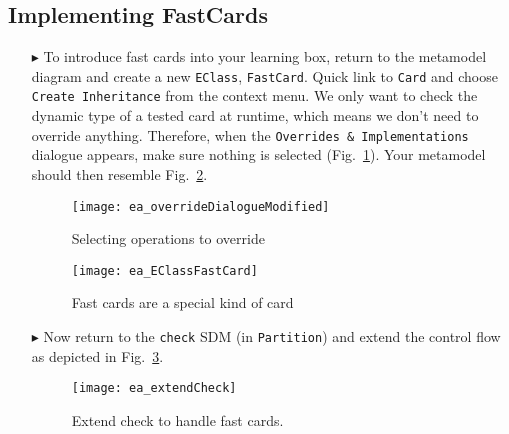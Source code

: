 \newpage
\subsection{Implementing FastCards}
\genHeader
\hypertarget{fastCard vis}{}

\begin{itemize}

\item[$\blacktriangleright$] To introduce fast cards into your learning box, return to the metamodel diagram and create a new \texttt{EClass},
\texttt{FastCard}. Quick link to \texttt{Card} and choose \texttt{Create Inheritance} from the context menu. We only want to check the dynamic type of a
tested card at runtime, which means we don't need to override anything. Therefore, when the \texttt{Overrides \& Implementations} dialogue appears, make sure
nothing is selected (Fig.~\ref{ea:dialogue_override}). Your metamodel should then resemble Fig.~\ref{ea:metamodel_FastCard}.

\vspace{0.5cm}

\begin{figure}[htp]
\begin{center}
  \texttt{[image: ea\_overrideDialogueModified]}
  \caption{Selecting operations to override}  
  \label{ea:dialogue_override}
\end{center}
\end{figure}

\begin{figure}[htp]
\begin{center}
  \texttt{[image: ea\_EClassFastCard]}
  \caption{Fast cards are a special kind of card}  
  \label{ea:metamodel_FastCard}
\end{center}
\end{figure}

\vspace{0.5cm}

\item[$\blacktriangleright$] Now return to the \texttt{check} SDM (in \texttt{Partition}) and extend the control flow as depicted in
Fig.~\ref{ea:extendCheck}.

 \vspace{0.5cm}
 
\begin{figure}[htbp]
\begin{center}
  \texttt{[image: ea\_extendCheck]}
  \caption{Extend check to handle fast cards.}  
  \label{ea:extendCheck}
\end{center}
\end{figure}
 


\end{itemize}
